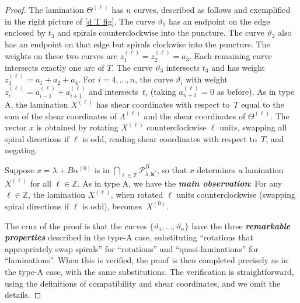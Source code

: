 \documentclass{amsart}
\theoremstyle{definition}
\theoremstyle{remark}
\numberwithin{equation}{section}
\newcommand{\newword}[1]{\textbf{\emph{#1}}}
\newcommand{\integers}{\mathbb Z}
\newcommand{\thet}{\vartheta}
\newcommand{\set}[1]{{\lbrace #1 \rbrace}}
\newcommand{\0}{{\mathbf{0}}}
\newcommand{\kk}{{\boldsymbol{k}}}
\renewcommand{\P}{\mathcal{P}}
\begin{document}
\begin{proof}
The lamination $\Theta^{(\ell)}$ has $n$ curves, described as follows and exemplified in the right picture of  \cref{d T fig}.
The curve $\thet_1$ has an endpoint on the edge enclosed by $t_3$ and spirals counterclockwise into the puncture.
The curve $\thet_2$ also has an endpoint on that edge but spirals clockwise into the puncture.
The weights on these two curves are $z_1^{(\ell)}=z_2^{(\ell)}=a_3$.
Each remaining curve intersects exactly one arc of $T$.
The curve $\thet_3$ intersects $t_3$ and has weight $z_3^{(\ell)}=a_1+a_2+a_4$.
For $i=4,\ldots,n$, the curve $\thet_i$ with weight $z_i^{(\ell)}=a_{i-1}^{(\ell)}+a_{i+1}^{(\ell)}$ and intersects~$t_i$ (taking $a_{n+1}^{(\ell)}=0$ as before).
As in type A, the lamination $X^{(\ell)}$ has shear coordinates with respect to~$T$ equal to the sum of the shear coordinates of $\Lambda^{(\ell)}$ and the shear coordinates of $\Theta^{(\ell)}$.
The vector $x$ is obtained by rotating $X^{(\ell)}$ counterclockwise $\ell$ units, swapping all spiral directions if $\ell$ is odd, reading shear coordinates with respect to~$T$, and negating.

Suppose $x=\lambda+B\alpha^{(0)}$ is in $\bigcap_{\ell\in\integers}\P^B_{\lambda,\kk^\ell}$, so that $x$ determines a lamination $X^{(\ell)}$ for all $\ell\in\integers$.
As in type A, we have the \newword{main observation}:
For any $\ell\in\integers$, the lamination $X^{(\ell)}$, when rotated $\ell$ units counterclockwise (swapping spiral directions if $\ell$ is odd), becomes~$X^{(0)}$.

The crux of the proof is that the curves $\set{\thet_1,\ldots,\thet_n}$ have the three \newword{remarkable properties} described in the type-A case, substituting ``rotations that appropriately swap spirals'' for ``rotations'' and ``quasi-laminations'' for ``laminations''.
When this is verified, the proof is then completed precisely as in the type-A case, with the same substitutions.
The verification is straightforward, using the definitions of compatibility and shear coordinates, and we omit the details.


\end{proof}
\end{document}
